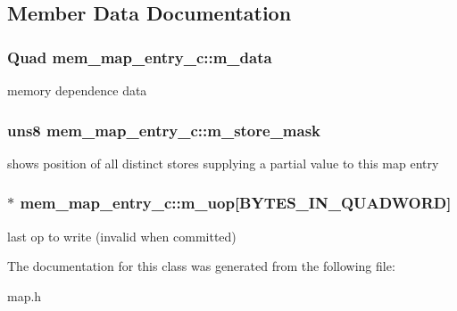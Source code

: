 \subsection{Member Data Documentation}
\hypertarget{classmem__map__entry__c_a3d7080bd5290849a0ee2482d38a66cf1}{
\subsubsection[{m\_\-data}]{\setlength{\rightskip}{0pt plus 5cm}Quad {\bf mem\_\-map\_\-entry\_\-c::m\_\-data}}}
\label{classmem__map__entry__c_a3d7080bd5290849a0ee2482d38a66cf1}
memory dependence data \hypertarget{classmem__map__entry__c_aa4d50f7f30287bd33107a8579f898be5}{
\subsubsection[{m\_\-store\_\-mask}]{\setlength{\rightskip}{0pt plus 5cm}uns8 {\bf mem\_\-map\_\-entry\_\-c::m\_\-store\_\-mask}}}
\label{classmem__map__entry__c_aa4d50f7f30287bd33107a8579f898be5}
shows position of all distinct stores supplying a partial value to this map entry \hypertarget{classmem__map__entry__c_a3ca3d13eb2521e21ed2776293f4f20c4}{
\subsubsection[{m\_\-uop}]{$\ast$ {\bf mem\_\-map\_\-entry\_\-c::m\_\-uop}\mbox{[}BYTES\_\-IN\_\-QUADWORD\mbox{]}}}
\label{classmem__map__entry__c_a3ca3d13eb2521e21ed2776293f4f20c4}
last op to write (invalid when committed) 

The documentation for this class was generated from the following file:\begin{DoxyCompactItemize}
\item 
map.h\end{DoxyCompactItemize}
